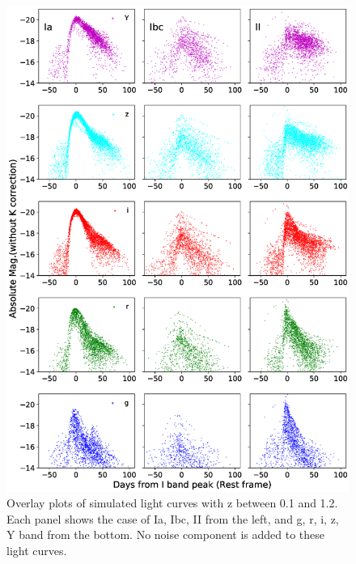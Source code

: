 \documentclass[useamsfonts]{pasj01}
\begin{document}
\begin{figure}[ht]
  \begin{center}
     \includegraphics[width=\columnwidth]{figures/SimLCsamples.eps}
  \end{center}
  \caption{%
  Overlay plots of simulated light curves with z between 0.1 and 1.2.
  Each panel shows the case of Ia, Ibc, II from the left, and g, r, i, z, Y band from the bottom.
  No noise component is added to these light curves.
  }%
  \label{fig:simLCsamples}
\end{figure}
%
%
\end{document}
